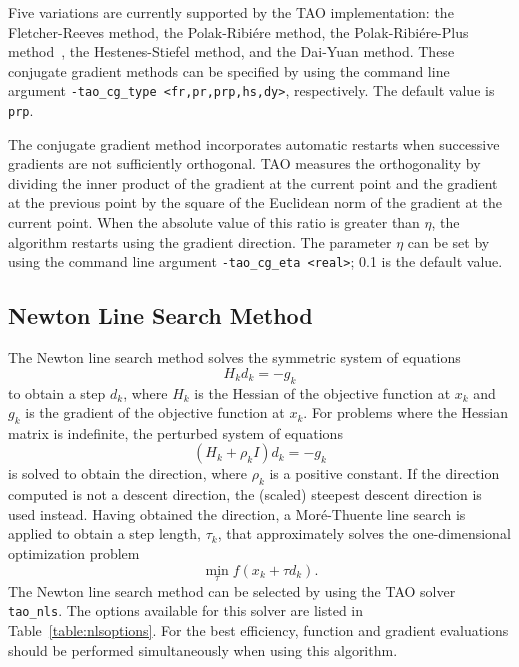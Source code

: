 \documentclass[]{book}
\begin{document}
Five variations are currently supported by the TAO implementation: the 
Fletcher-Reeves method, the Polak-Ribi\'ere method, the Polak-Ribi\'ere-Plus 
method~\cite{NW99}, the Hestenes-Stiefel method, and the Dai-Yuan method.  
These conjugate gradient methods can be specified by using the command line 
argument {\tt -tao\_cg\_type <fr,pr,prp,hs,dy>}, respectively.  The default 
value is {\tt prp}.  

The conjugate gradient method incorporates automatic restarts when successive 
gradients are not sufficiently orthogonal.  TAO measures the orthogonality by 
dividing the inner product of the gradient at the current point and the 
gradient at the previous point by the square of the Euclidean norm of 
the gradient at the current point.  When the absolute value of this 
ratio is greater than $\eta$, the algorithm restarts using the gradient 
direction.  The parameter $\eta$ can be set by using the command line argument 
{\tt -tao\_cg\_eta <real>}; 0.1 is the default value.  

\subsection{Newton Line Search Method}%

The Newton line search method solves the symmetric system of equations
\[
H_k d_k = -g_k
\]
to obtain a step $d_k$, where $H_k$ is the Hessian of the objective function
at $x_k$ and $g_k$ is the gradient of the objective function at $x_k$.
For problems where the Hessian matrix is indefinite, the perturbed system
of equations
\[
(H_k + \rho_k I) d_k = -g_k
\]
is solved to obtain the direction, where $\rho_k$ is a positive constant.
If the direction computed is not a descent direction, the (scaled) steepest 
descent direction is used instead.  Having obtained the direction, 
a Mor\'{e}-Thuente line search is applied to obtain a step length, 
$\tau_k$, that approximately solves the one-dimensional optimization 
problem
\[
\min_\tau f(x_k + \tau d_k).
\]
The Newton line search method can be selected by using the TAO 
solver {\tt tao\_nls}.
The options available for this solver are listed in
Table~\ref{table:nlsoptions}.
For the best efficiency, function and gradient evaluations should be 
performed simultaneously when using this algorithm.
\end{document}
